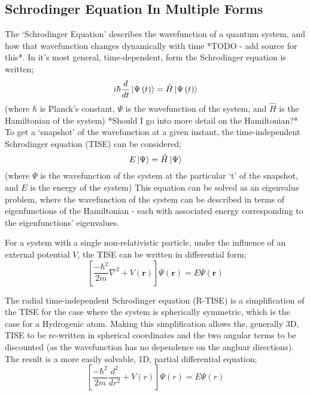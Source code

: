 \subsection{Schrodinger Equation In Multiple Forms}
The `Schrodinger Equation' describes the wavefunction of a quantum system, and how that wavefunction changes dynamically with time *TODO - add source for this*. In it's most general, time-dependent, form the Schrodinger equation is written;
$$
i\hbar \frac{d}{dt}\ket{\Psi\left(t\right)} = \hat{H}\ket{\Psi\left(t\right)} 
$$
(where $\hbar$ is Planck's constant, $\Psi$ is the wavefunction of the system, and $\hat{H}$ is the Hamiltonian of the system)\newline
*Should I go into more detail on the Hamiltonian?*
\newline
To get a `snapshot' of the wavefunction at a given instant, the time-independent Schrodinger equation (TISE) can be considered;
$$
E\ket{\Psi} = \hat{H}\ket{\Psi} 
$$
(where $\Psi$ is the wavefunction of the system at the particular `t' of the snapshot, and $E$ is the energy of the system)\newline
This equation can be solved as an eigenvalue problem, where the wavefunction of the system can be described in terms of eigenfunctions of the Hamiltonian - each with associated energy corresponding to the eigenfunctions' eigenvalues.\newline

For a system with a single non-relativistic particle, under the influence of an external potential $V$, the TISE can be written in differential form;
$$
\left[\frac{-\hbar^{2}}{2m}\nabla^{2} + V\left(\mathbf{r}\right)\right] \Psi\left(\mathbf{r}\right) = E\Psi\left(\mathbf{r}\right)
$$

The radial time-independent Schrodinger equation (R-TISE) is a simplification of the TISE for the case where the system is spherically symmetric, which is the case for a Hydrogenic atom.%
Making this simplification allows the, generally 3D, TISE to be re-written in spherical coordinates and the two angular terms to be discounted (as the wavefunction has no dependence on the angluar directions). The result is a more easily solvable, 1D, partial differential equation;
$$
\left[\frac{-\hbar^{2}}{2m}\frac{d^2}{dr^2} + V\left(r\right)\right] \Psi\left(r\right) = E\Psi\left(r\right)
$$



